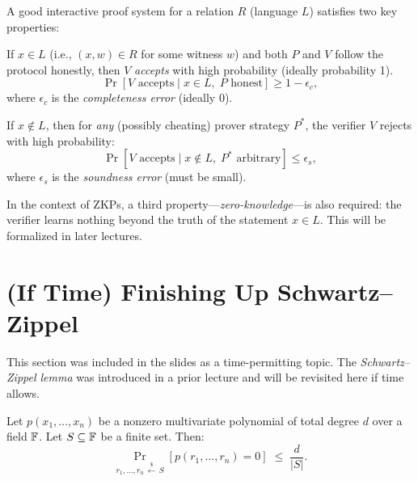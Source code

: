 \documentclass[11pt]{article}
\begin{document}
A good interactive proof system for a relation $R$ (language $L$) satisfies two key
properties:

\begin{tcolorbox}[colback=green!5!white, colframe=green!60!black,
  title=Properties of Interactive Proofs]
\begin{definition}[Completeness]
If $x \in L$ (i.e., $(x, w) \in R$ for some witness $w$) and both $P$ and $V$ follow
the protocol honestly, then $V$ \emph{accepts} with high probability (ideally probability 1).
\[
  \Pr[V \text{ accepts} \mid x \in L,\; P \text{ honest}] \geq 1 - \epsilon_c,
\]
where $\epsilon_c$ is the \emph{completeness error} (ideally $0$).
\end{definition}

\begin{definition}[Soundness]
If $x \notin L$, then for \emph{any} (possibly cheating) prover strategy $P^*$, the
verifier $V$ rejects with high probability:
\[
  \Pr[V \text{ accepts} \mid x \notin L,\; P^* \text{ arbitrary}] \leq \epsilon_s,
\]
where $\epsilon_s$ is the \emph{soundness error} (must be small).
\end{definition}
\end{tcolorbox}

\begin{remark}
In the context of ZKPs, a third property---\emph{zero-knowledge}---is also required:
the verifier learns nothing beyond the truth of the statement $x \in L$.
This will be formalized in later lectures.
\end{remark}

\section{(If Time) Finishing Up Schwartz--Zippel}

This section was included in the slides as a time-permitting topic.
The \emph{Schwartz--Zippel lemma} was introduced in a prior lecture and will be
revisited here if time allows.

\begin{theorem}
Let $p(x_1, \ldots, x_n)$ be a nonzero multivariate polynomial of total degree $d$ over
a field $\mathbb{F}$.  Let $S \subseteq \mathbb{F}$ be a finite set.  Then:
\[
  \Pr_{r_1,\ldots,r_n \,\xleftarrow{\$}\, S}\!\left[p(r_1,\ldots,r_n) = 0\right]
  \;\leq\;
  \frac{d}{|S|}.
\]
\end{theorem}
\end{document}

